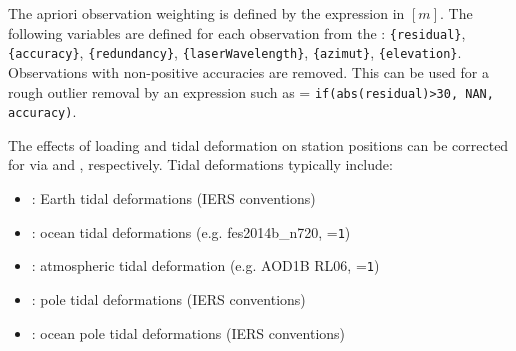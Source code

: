 The apriori observation weighting is defined by the expression  in $[m]$.
The following variables are defined for each observation from the
: \verb|{residual}|, \verb|{accuracy}|,
\verb|{redundancy}|, \verb|{laserWavelength}|, \verb|{azimut}|, \verb|{elevation}|.
Observations with non-positive accuracies are removed.
This can be used for a rough outlier removal by an expression such as
 = \verb|if(abs(residual)>30, NAN, accuracy)|.

The effects of loading and tidal deformation on station positions can be corrected for
via  and
, respectively.
Tidal deformations typically include:
\begin{itemize}
  \item {}: Earth tidal deformations (IERS conventions)
  \item {}: ocean tidal deformations
        (e.g. fes2014b\_n720, =\verb|1|)
  \item {}: atmospheric tidal deformation
        (e.g. AOD1B RL06, =\verb|1|)
  \item {}: pole tidal deformations (IERS conventions)
  \item {}: ocean pole tidal deformations (IERS conventions)
\end{itemize}


